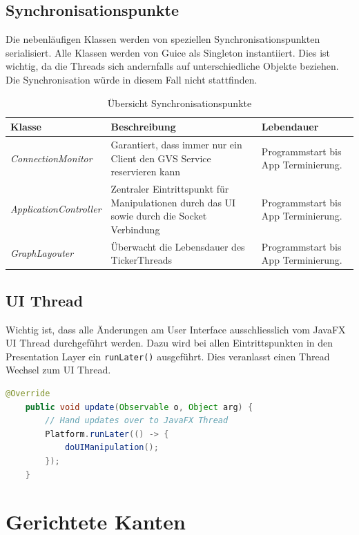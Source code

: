 \documentclass[11pt,a4paper,english,oneside]{book}
\numberwithin{equation}{chapter}
\begin{document}
	\subsection{Synchronisationspunkte}
	
	Die nebenläufigen Klassen werden von speziellen Synchronisationspunkten serialisiert. Alle Klassen werden von Guice \cite{guice} als Singleton instantiiert. Dies ist wichtig, da die Threads sich andernfalls auf unterschiedliche Objekte beziehen. Die Synchronisation würde in diesem Fall nicht stattfinden.
	
	\begin{table}[h!]
		\centering
		\begin{tabularx}{\linewidth}{l X X}
			\toprule 
			Klasse & Beschreibung & Lebendauer \\
			\midrule
			\textit{ConnectionMonitor} & Garantiert, dass immer nur ein Client den GVS Service reservieren kann & Programmstart bis App Terminierung. \\
			\textit{ApplicationController} & Zentraler Eintrittspunkt für Manipulationen durch das UI sowie durch die Socket Verbindung & Programmstart bis App Terminierung. \\
			\textit{GraphLayouter} & Überwacht die Lebensdauer des TickerThreads & Programmstart bis App Terminierung. \\
			\bottomrule 
		\end{tabularx} 
		\caption{Übersicht Synchronisationspunkte} 
	\end{table}
	
	\subsection{UI Thread}
	Wichtig ist, dass alle Änderungen am User Interface ausschliesslich vom JavaFX UI Thread durchgeführt werden. Dazu wird bei allen Eintrittspunkten in den Presentation Layer ein \lstinline|runLater()| ausgeführt. Dies veranlasst einen Thread Wechsel zum UI Thread. 
	
	\begin{lstlisting}[language=java, frame=single, caption={Java FX UI Thread}, label={code:uithread}]
	@Override
	public void update(Observable o, Object arg) {
		// Hand updates over to JavaFX Thread
		Platform.runLater(() -> {
			doUIManipulation();
		});
	}
	\end{lstlisting}
	
	\section{Gerichtete Kanten}
\end{document}
